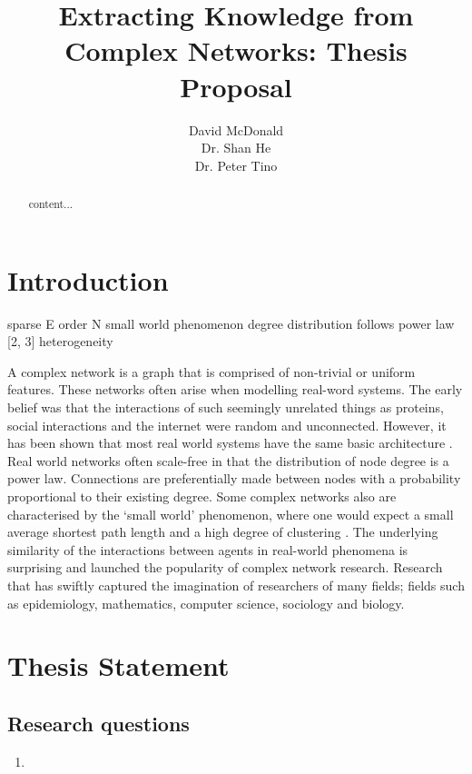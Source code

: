 \documentclass{report}
\title{\Huge \textbf{Extracting Knowledge from Complex Networks: Thesis Proposal}}
\author{David McDonald \\
	Dr. Shan He \\
	Dr. Peter Tino}
\date{}
\begin{document}
	
	\maketitle
	
	\begin{abstract}
		content...
	\end{abstract}
	
	\tableofcontents
	
	\chapter{Introduction}
	
	
		sparse E order N
		small world phenomenon
		degree distribution follows power law [2, 3]
		heterogeneity
		
		A complex network is a graph that is comprised of non-trivial or uniform features. These networks often arise when modelling real-word systems. The early belief was that the interactions of such seemingly unrelated things as proteins, social interactions and the internet were random and unconnected. However, it has been shown that most real world systems have the same basic architecture \cite{barabasi2009scale}. Real world networks often scale-free in that the distribution of node degree is a power law. Connections are preferentially made between nodes with a probability proportional to their existing degree. Some complex networks also are characterised by the `small world' phenomenon, where one would expect a small average shortest path length and a high degree of clustering \cite{watts1998collective}. The underlying similarity of the interactions between agents in real-world phenomena is surprising and launched the popularity of complex network research. Research that has swiftly captured the imagination of researchers of many fields; fields such as epidemiology, mathematics, computer science, sociology and biology.

	
	
	\chapter{Thesis Statement}
	
	\section{Research questions}
	
	\begin{enumerate}
		\item
	\end{enumerate}
	
\end{document}
